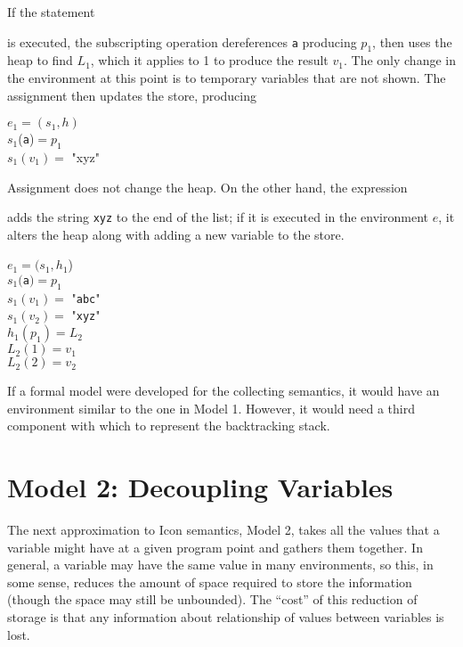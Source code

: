 \noindent
If the statement 



\noindent is executed, the subscripting operation dereferences \texttt{a}
producing $p_1$, then uses the heap to find $L_1$, which it applies to
1 to produce the result $v_1$. The only change in the environment at
this point is to temporary variables that are not shown. The
assignment then updates the store, producing

\goodbreak
\begin{iconcode}
\>$e_1 = (s_1 , h)$\\
\>$s_1$(\texttt{a})$ = p_1$\\
\>$s_1(v_1) =$ "xyz"\\
\end{iconcode}

\noindent
Assignment does not change the heap. On the other hand, the expression 


\noindent adds the string \texttt{xyz} to the end of the list; if it is
executed in the environment $e$, it alters the heap along with adding a
new variable to the store.

\goodbreak
\begin{specialcode}{}
\>$e_1 = (s_1 , h_1$)\\
\>$s_1($\texttt{a}$) = p_1$\\
\>$s_1(v_1) =$ "\texttt{abc}"\\
\>$s_1(v_2) =$ "\texttt{xyz}"\\
\>$h_1(p_1) = L_2$\\
\>$L_2(1) = v_1$\\
\>$L_2(2) = v_2$\\
\end{specialcode}


If a formal model were developed for the collecting semantics, it
would have an environment similar to the one in Model 1. However, it
would need a third component with which to represent the backtracking
stack.

\section*{Model 2: Decoupling Variables}

The next approximation to Icon semantics, Model 2, takes all the
values that a variable might have at a given program point and gathers
them together. In general, a variable may have the same value in many
environments, so this, in some sense, reduces the amount of space
required to store the information (though the space may still be
unbounded). The ``cost'' of this reduction of storage is that any
information about relationship of values between variables is lost.

